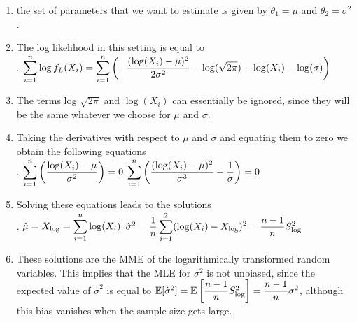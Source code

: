 \begin{enumerate}
    \item the set of parameters that we want to estimate is given by $\theta_1 = \mu$ and $\theta_2 = \sigma^ 2 $.
    \hfill \cite{statistics/book/Statistics-for-Data-Scientists/Maurits-Kaptein}

    \item The log likelihood in this setting is equal to
    \hfill \cite{statistics/book/Statistics-for-Data-Scientists/Maurits-Kaptein}
    \\
    .\hfill
    $
        \displaystyle\sum ^n _{i=1} \log f _L (X_i )
        = \displaystyle\sum ^n _{i=1} \left(
            - \dfrac{(\log (X_i ) - \mu)^2} {2\sigma^2}
            - \log (\sqrt{2\pi})
            - \log(X_i )
            - \log (\sigma )
        \right)
    $
    \hfill \cite{statistics/book/Statistics-for-Data-Scientists/Maurits-Kaptein}

    \item The terms log $\sqrt{2\pi}$ and $\log(X_i )$ can essentially be ignored, since they will be the same whatever we choose for $\mu$ and $\sigma$.
    \hfill \cite{statistics/book/Statistics-for-Data-Scientists/Maurits-Kaptein}

    \item Taking the derivatives with respect to $\mu$ and $\sigma$ and equating them to zero we obtain the following equations
    \hfill \cite{statistics/book/Statistics-for-Data-Scientists/Maurits-Kaptein}
    \\
    .\hfill
    $
        \displaystyle\sum^n_{i=1} \left( \dfrac{\log(X_i ) - \mu }{\sigma^ 2} \right) = 0
    $
    \hfill
    $
        \displaystyle\sum ^n _{i=1} \left( \dfrac{(\log (X_i) - \mu)^2 }{\sigma^3} - \dfrac{1}{ \sigma}\right) = 0
    $
    \hfill \cite{statistics/book/Statistics-for-Data-Scientists/Maurits-Kaptein}

    \item Solving these equations leads to the solutions
    \hfill \cite{statistics/book/Statistics-for-Data-Scientists/Maurits-Kaptein}
    \\
    .\hfill
    $\hat{\mu} = \bar{X}_{\log} = \displaystyle\sum ^n _{i=1} \log(X_i ) $
    \hfill
    $
        \hat{\sigma}^ 2
        = \dfrac{1}{n} \displaystyle\sum^2 _{i=1}(\log(X_i ) - \bar{X}_{\log})^2
        = \dfrac{n - 1}{n}S^2_{ \log}
    $
    \hfill \cite{statistics/book/Statistics-for-Data-Scientists/Maurits-Kaptein}

    \item These solutions are the MME of the logarithmically transformed random variables.
    This implies that the MLE for $\sigma^  2$ is not unbiased, since the expected value of $\hat{\sigma}^2$ is equal to $\mathbb{E}[\hat{\sigma}^2] = \mathbb{E}\left[\dfrac{n - 1}{n} S^2 _{\log}\right] = \dfrac{n - 1}{n} \sigma^2$, although this bias vanishes when the sample size gets large.
    \hfill \cite{statistics/book/Statistics-for-Data-Scientists/Maurits-Kaptein}


\end{enumerate}
